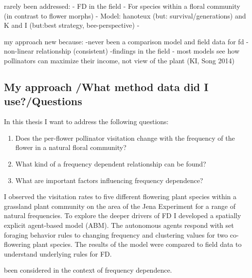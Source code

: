 rarely been addressed: 
- FD in the field
- For species within a floral community (in contrast to flower morphs)
- Model: hanoteux (but: survival/generations) and K and I (but:best strategy, bee-perspective)
-

my approach new because: 
-never been a comparison model and field data for fd
-non-linear relationship (consistent)
-findings in the field
- most models see how pollinators can maximize their income, not view of the plant (KI, Song 2014)


\subsection*{My approach /What method data did I use?/Questions}
In this thesis I want to address the following questions: 

\begin{enumerate}
	\item Does the per-flower pollinator visitation change with the frequency of the flower in a natural floral community? \\
	\item	What kind of a frequency dependent relationship can be found?\\
	\item	What are important factors influencing frequency dependence?\\
\end{enumerate}

I observed the visitation rates to five different flowering plant species within a grassland plant community on the area of the Jena Experiment for a range of natural frequencies. To explore the deeper drivers of FD I developed a spatially explicit agent-based model (ABM). The autonomous agents respond with set foraging behavior rules to changing frequency and clustering values for two co-flowering plant species. The results of the model were compared to field data to understand underlying rules for FD. 

been considered in the context of frequency dependence.


